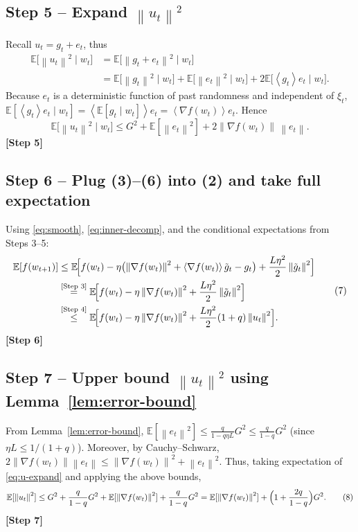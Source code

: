 \documentclass{article}
\newcommand{\E}{\mathbb{E}}
\newcommand{\norm}[1]{\left\|#1\right\|}
\newcommand{\inner}[1]{\left\langle #1 \right\rangle}
\begin{document}
\subsection*{Step 5 – Expand $\norm{u_{t}}^{2}$}
Recall $u_{t}=g_{t}+e_{t}$, thus
\[
\begin{aligned}
\E\bigl[\norm{u_{t}}^{2}\mid w_{t}\bigr]
&= \E\bigl[\norm{g_{t}+e_{t}}^{2}\mid w_{t}\bigr]\\
&= \E\bigl[\norm{g_{t}}^{2}\mid w_{t}\bigr]+\E\bigl[\norm{e_{t}}^{2}\mid w_{t}\bigr]
      +2\E\bigl[\inner{g_{t}}{e_{t}}\mid w_{t}\bigr].
\end{aligned}
\]
Because $e_{t}$ is a deterministic function of past randomness and independent of $\xi_{t}$,
$\E[\inner{g_{t}}{e_{t}}\mid w_{t}]=\inner{\E[g_{t}\mid w_{t}]}{e_{t}}=\inner{\nabla f(w_{t})}{e_{t}}$.
Hence
\[
\E\bigl[\norm{u_{t}}^{2}\mid w_{t}\bigr]
\le G^{2}+ \E[\norm{e_{t}}^{2}] + 2\norm{\nabla f(w_{t})}\,\norm{e_{t}} .
\tag{6}\label{eq:u-expand}
\]
\noindent\textbf{[Step 5]}

\subsection*{Step 6 – Plug (3)–(6) into (2) and take full expectation}
Using \eqref{eq:smooth}, \eqref{eq:inner-decomp}, and the conditional expectations from Steps 3–5:
\[
\begin{aligned}
\E[f(w_{t+1})]
&\le \E\!\Bigl[f(w_{t}) -\eta\bigl(\norm{\nabla f(w_{t})}^{2}
        +\inner{\nabla f(w_{t})}{\tilde g_{t}-g_{t}}\bigr)
        +\frac{L\eta^{2}}{2}\norm{\tilde g_{t}}^{2}\Bigr] \\
&\overset{\text{[Step 3]}}{=}
\E\!\Bigl[f(w_{t}) -\eta\norm{\nabla f(w_{t})}^{2}
        +\frac{L\eta^{2}}{2}\norm{\tilde g_{t}}^{2}\Bigr] \\
&\overset{\text{[Step 4]}}{\le}
\E\!\Bigl[f(w_{t}) -\eta\norm{\nabla f(w_{t})}^{2}
        +\frac{L\eta^{2}}{2}(1+q)\norm{u_{t}}^{2}\Bigr].
\end{aligned}
\tag{7}\label{eq:one-step}
\]
\noindent\textbf{[Step 6]}

\subsection*{Step 7 – Upper bound $\norm{u_{t}}^{2}$ using Lemma~\ref{lem:error-bound}}
From Lemma~\ref{lem:error-bound}, $\E[\norm{e_{t}}^{2}]\le \frac{q}{1-q\eta L}G^{2}\le \frac{q}{1-q}G^{2}$ (since $\eta L\le 1/(1+q)$). Moreover, by Cauchy–Schwarz,
$2\norm{\nabla f(w_{t})}\norm{e_{t}}\le \norm{\nabla f(w_{t})}^{2}+ \norm{e_{t}}^{2}$.
Thus, taking expectation of \eqref{eq:u-expand} and applying the above bounds,
\[
\E[\norm{u_{t}}^{2}]
\le G^{2}+ \frac{q}{1-q}G^{2}+ \E[\norm{\nabla f(w_{t})}^{2}]
      +\frac{q}{1-q}G^{2}
= \E[\norm{\nabla f(w_{t})}^{2}] + \Bigl(1+\frac{2q}{1-q}\Bigr)G^{2}.
\tag{8}\label{eq:u-bound}
\]
\noindent\textbf{[Step 7]}
\end{document}
